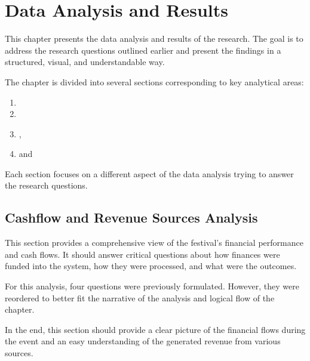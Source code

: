 \chapter{Data Analysis and Results}
\label{ch:data-analysis-and-results}

This chapter presents the data analysis and results of the research.
The goal is to address the research questions outlined earlier and present the findings in a structured, visual, and understandable way.

The chapter is divided into several sections corresponding to key analytical areas:\\
\begin{enumerate}
	\item {}
	\item {}
	\item {},
	\item and~
\end{enumerate}

Each section focuses on a different aspect of the data analysis trying to answer the research questions.



\section{Cashflow and Revenue Sources Analysis}
\label{sec:analysis-cashflow-and-revenue-sources}

This section provides a comprehensive view of the festival's financial performance and cash flows.
It should answer critical questions about how finances were funded into the system, how they were processed, and what were the outcomes.

For this analysis, four questions were previously formulated.
However, they were reordered to better fit the narrative of the analysis and logical flow of the chapter.

In the end, this section should provide a clear picture of the financial flows during the event and an easy understanding of the generated revenue from various sources.

